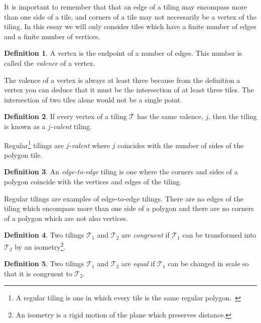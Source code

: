 \documentclass[a4paper,12pt,twoside,abstraction,titlepage]{article}
\theoremstyle{remark}
\theoremstyle{definition}
\newtheorem{definition}{Definition}[section]
\begin{document}
\noindent It is important to remember that that an edge of a tiling may encompass more than one side of a tile, and corners of a tile may not necessarily be a vertex of the tiling. In this essay we will only consider tiles which have a finite number of edges and a finite number of vertices.

\begin{definition}\label{valence}
A vertex is the endpoint of a number of edges. This number is called the \emph{valence} of a vertex.~\cite[\S 1.1]{branko}
\end{definition}

\noindent The valence of a vertex is always at least three because from the definition a vertex you can deduce that it must be the intersection of at least three tiles. The intersection of two tiles alone would not be a single point.

\begin{definition}\label{jvalence}
If every vertex of a tiling $\mathscr{T}$ has the same valence, $j$, then the tiling is known as a $j$\emph{-valent} tiling.~\cite[\S 1.1]{branko}
\end{definition}

\noindent Regular\footnote{A regular tiling is one in which every tile is the same regular polygon.~\cite{branko}} tilings are $j$\emph{-valent} where $j$ coincides with the number of sides of the polygon tile.


\begin{definition}
An \emph{edge-to-edge} tiling is one where the corners and sides of a polygon coincide with the vertices and edges of the tiling.~\cite[\S 1.1]{branko}
\end{definition}

\noindent Regular tilings are examples of edge-to-edge tilings. There are no edges of the tiling which encompass more than one side of a polygon and there are no corners of a polygon which are not also vertices.

\begin{definition}
Two tilings $\mathscr{T}_1$ and $\mathscr{T}_2$ are \emph{congruent} if $\mathscr{T}_1$ can be transformed into $\mathscr{T}_2$ by an isometry\footnote{An isometry is a rigid motion of the plane which preserves distance.}.~\cite[\S 1.1]{branko}
\end{definition}

\begin{definition}
Two tilings $\mathscr{T}_1$ and $\mathscr{T}_2$ are \emph{equal} if $\mathscr{T}_1$ can be changed in scale so that it is congruent to $\mathscr{T}_2$.~\cite[\S 1.1]{branko}
\end{definition}
\end{document}
